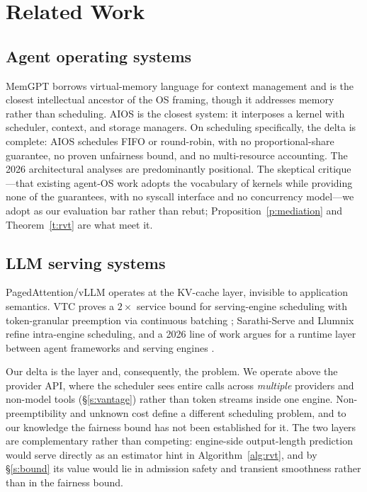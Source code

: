\documentclass[letterpaper,11pt,leqno]{article}
\begin{document}
\section{Related Work}\label{s:related}

\subsection{Agent operating systems}\label{s:rel-agentos}

MemGPT \citep{Packer23} borrows virtual-memory language for context management and is the closest intellectual ancestor of the OS framing, though it addresses memory rather than scheduling. AIOS \citep{Mei25, Ge23} is the closest system: it interposes a kernel with scheduler, context, and storage managers. On scheduling specifically, the delta is complete: AIOS schedules FIFO or round-robin, with no proportional-share guarantee, no proven unfairness bound, and no multi-resource accounting. The 2026 architectural analyses \citep{Zhao26, Pirch26, RuntimeInfra26} are predominantly positional. The skeptical critique \citep{Knowlee26}---that existing agent-OS work adopts the vocabulary of kernels while providing none of the guarantees, with no syscall interface and no concurrency model---we adopt as our evaluation bar rather than rebut; Proposition~\ref{p:mediation} and Theorem~\ref{t:rvt} are what meet it.

\subsection{LLM serving systems}\label{s:rel-serving}

PagedAttention/vLLM \citep{Kwon23} operates at the KV-cache layer, invisible to application semantics. VTC \citep{Sheng24} proves a $2\times$ service bound for serving-engine scheduling with token-granular preemption via continuous batching \citep{Yu22}; Sarathi-Serve \citep{Agrawal24} and Llumnix \citep{Sun24} refine intra-engine scheduling, and a 2026 line of work argues for a runtime layer between agent frameworks and serving engines \citep{Zhang26}.

Our delta is the layer and, consequently, the problem. We operate above the provider API, where the scheduler sees entire calls across \emph{multiple} providers and non-model tools (\S\ref{s:vantage}) rather than token streams inside one engine. Non-preemptibility and unknown cost define a different scheduling problem, and to our knowledge the fairness bound has not been established for it. The two layers are complementary rather than competing: engine-side output-length prediction would serve directly as an estimator hint in Algorithm~\ref{alg:rvt}, and by \S\ref{s:bound} its value would lie in admission safety and transient smoothness rather than in the fairness bound.
\end{document}

